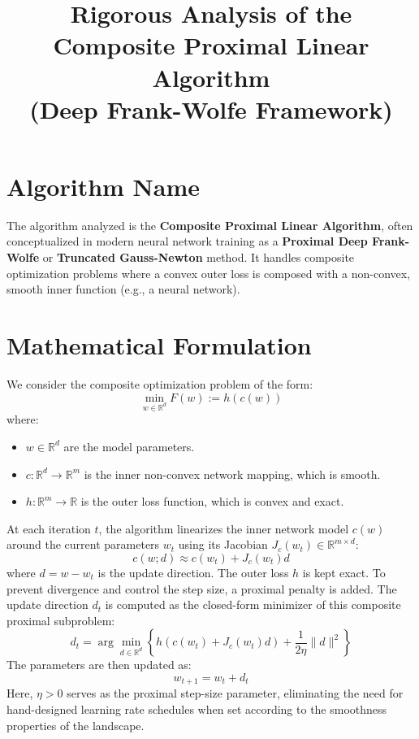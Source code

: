 \documentclass[11pt]{article}
\title{Rigorous Analysis of the Composite Proximal Linear Algorithm \\ (Deep Frank-Wolfe Framework)}
\date{}
\begin{document}
\maketitle

\section*{Algorithm Name}
The algorithm analyzed is the \textbf{Composite Proximal Linear Algorithm}, often conceptualized in modern neural network training as a \textbf{Proximal Deep Frank-Wolfe} or \textbf{Truncated Gauss-Newton} method. It handles composite optimization problems where a convex outer loss is composed with a non-convex, smooth inner function (e.g., a neural network).

\section*{Mathematical Formulation}
We consider the composite optimization problem of the form:
\begin{equation}
    \min_{w \in \mathbb{R}^d} F(w) := h(c(w))
\end{equation}
where:
\begin{itemize}
    \item $w \in \mathbb{R}^d$ are the model parameters.
    \item $c: \mathbb{R}^d \to \mathbb{R}^m$ is the inner non-convex network mapping, which is smooth.
    \item $h: \mathbb{R}^m \to \mathbb{R}$ is the outer loss function, which is convex and exact.
\end{itemize}

At each iteration $t$, the algorithm linearizes the inner network model $c(w)$ around the current parameters $w_t$ using its Jacobian $J_c(w_t) \in \mathbb{R}^{m \times d}$:
\begin{equation}
    c(w; d) \approx c(w_t) + J_c(w_t)d
\end{equation}
where $d = w - w_t$ is the update direction. The outer loss $h$ is kept exact. To prevent divergence and control the step size, a proximal penalty is added. The update direction $d_t$ is computed as the closed-form minimizer of this composite proximal subproblem:
\begin{equation}
    d_t = \arg\min_{d \in \mathbb{R}^d} \left\{ h(c(w_t) + J_c(w_t)d) + \frac{1}{2\eta} \|d\|^2 \right\}
\end{equation}
The parameters are then updated as:
\begin{equation}
    w_{t+1} = w_t + d_t
\end{equation}
Here, $\eta > 0$ serves as the proximal step-size parameter, eliminating the need for hand-designed learning rate schedules when set according to the smoothness properties of the landscape.
\end{document}
